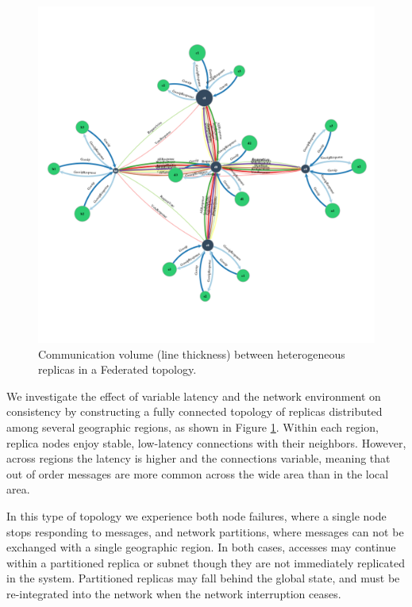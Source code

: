 \documentclass[10pt,conference,letterpaper]{IEEEtran}
\begin{document}
\begin{figure}
    \centering
      \includegraphics[width=\linewidth]{figures/federated_sync}
    \caption{Communication volume (line thickness) between  heterogeneous replicas in a Federated topology.}
    \label{fig:topology}
\end{figure}

We investigate the effect of variable latency and the network environment on consistency by
constructing a fully connected topology of replicas distributed among several
geographic regions, as shown in Figure \ref{fig:topology}.
Within each region, replica nodes enjoy stable, low-latency connections with their
neighbors.
However, across regions the latency is higher and the connections variable, meaning that
out of order messages are more common across the wide area than in the local area.

In this type of topology we experience both
node failures, where a single node stops responding to
messages, and network partitions, where messages can not be exchanged
with a single geographic region.
In both cases, accesses may continue within a partitioned replica or subnet
though they are not immediately replicated in the system.
Partitioned replicas may fall behind the global state, and must be
re-integrated into the network when the network interruption ceases.
\end{document}
